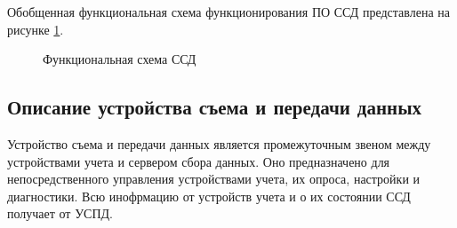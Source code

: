 Обобщенная функциональная схема функционирования ПО ССД представлена на рисунке \ref{sh_ssd:sh_ssd}.

\begin{figure}[h!]
 \caption{Функциональная схема ССД}
 \label{sh_ssd:sh_ssd}
\end{figure}

\subsection{Описание устройства съема и передачи данных}

Устройство съема и передачи данных является промежуточным звеном между устройствами учета и сервером сбора данных. Оно предназначено для непосредственного управления устройствами учета, их опроса, настройки и диагностики. Всю инофрмацию от устройств учета и о их состоянии ССД получает от УСПД.

